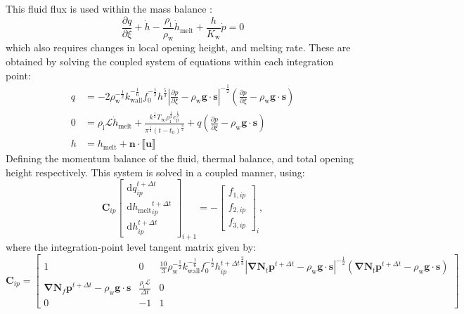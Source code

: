 \documentclass[3p]{elsarticle} %
\begin{document}
This fluid flux is used within the mass balance \citep{Boone1990, deBorst2017, Hageman2019}:
\begin{equation}
    \frac{\partial q}{\partial \xi} + \dot{h} - \frac{\rho_{\text{i}}}{\rho_{\text{w}}} \dot{h}_{\text{melt}}+ \frac{h}{K_{\text{w}}}\dot{p} = 0 \label{eq:MassBalance}
\end{equation}
which also requires changes in local opening height, and melting rate. These are obtained by solving the coupled system of equations within each integration point:
\begin{align}
    q &= -2\rho_{\text{w}}^{-\frac{1}{2}}k_{\text{wall}}^{-\frac{1}{6}}f_0^{-\frac{1}{2}} h^{\frac{5}{3}}\left|\frac{\partial p}{\partial \xi}-\rho_{\text{w}} \mathbf{g} \cdot \mathbf{s}\right|^{-\frac{1}{2}}\left(\frac{\partial p}{\partial \xi}-\rho_{\text{w}} \mathbf{g} \cdot \mathbf{s}\right) \label{SIeq:qx}\\
    0&=\rho_{\text{i}} \mathcal{L}\dot{h}_{\text{melt}} + \frac{k^{\frac{1}{2}}T_\infty \rho_{\text{i}}^{\frac{1}{2}}c_{\mathrm{p}}^{\frac{1}{2}}}{\pi^{\frac{1}{2}}\left(t-t_0\right)^{\frac{3}{2}}}  + q \left(\frac{\partial p}{\partial \xi}-\rho_{\text{w}} \mathbf{g} \cdot \mathbf{s}\right) \label{SIeq:hmelt}\\
    h &= h_{\text{melt}} + \mathbf{n}\cdot\llbracket \mathbf{u} \rrbracket\label{SIeq:htotal}
\end{align}
Defining the momentum balance of the fluid, thermal balance, and total opening height respectively. This system is solved in a coupled manner, using:
\begin{equation}
    \bm{C}_{ip} \begin{bmatrix} \mathrm{d}{q}_{ip}^{t+\Delta t} \\ \mathrm{d} {h_{\text{melt}}}_{ip}^{t+\Delta t} \\ \mathrm{d} h^{t+\Delta t}_{ip} \end{bmatrix}_{i+1} = - \begin{bmatrix} f_{1,ip} \\ f_{2,ip} \\ f_{3,ip} \end{bmatrix}_i,
\end{equation}
where the integration-point level tangent matrix given by:
\begin{equation}
    \bm{C}_{ip} = \begin{bmatrix} 1 & 0 & \frac{10}{3}\rho_{\text{w}}^{-\frac{1}{2}}k_{\text{wall}}^{-\frac{1}{6}}f_0^{-\frac{1}{2}} {h_{ip}^{t+\Delta t}}^{\frac{2}{3}}\left|\bm{\nabla}\mathbf{N}_\mathrm{f} \mathbf{p}^{t+\Delta t}-\rho_{\text{w}} \mathbf{g} \cdot \mathbf{s}\right|^{-\frac{1}{2}}\left(\bm{\nabla}\mathbf{N}_\mathrm{f} \mathbf{p}^{t+\Delta t}-\rho_{\text{w}} \mathbf{g} \cdot \mathbf{s}\right) \\
    \bm{\nabla}\mathbf{N}_f \mathbf{p}^{t+\Delta t}-\rho_{\text{w}} \mathbf{g} \cdot \mathbf{s} & \frac{\rho_{\text{i}} \mathcal{L}}{\Delta t} & 0 \\
    0 & -1 & 1\end{bmatrix} \label{SIeq:CMat}
\end{equation}
\end{document}
